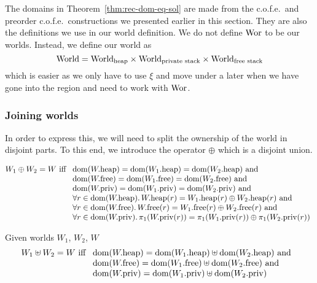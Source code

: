 \begin{jversion}
The domains in Theorem~\ref{thm:rec-dom-eq-sol} are made from the c.o.f.e.\ and preorder c.o.f.e.\ constructions we presented earlier in this section.
They are also the definitions we use in our world definition.
We do not define $\Wor$ to be our worlds.
Instead, we define our world as
\[
  \World = \Worldh \times \Worlds \times \Worldfs
\]
which is easier as we only have to use $\xi$ and move under a later when we have gone into the region and need to work with $\Wor$.

\subsubsection{Joining worlds}
In order to express this, we will need to split the ownership of the world in disjoint parts.
To this end, we introduce the operator $\oplus$ which is a disjoint union.
\begin{definition}
  \[
    W_1 \oplus W_2 = W
  \text{ iff }
  \begin{array}[t]{l}
    \dom(\pwheap) = \dom(\pwheap[W_1]) = \dom(\pwheap[W_2]) \tand \\
    \dom(\pwfree) = \dom(\pwfree[W_1]) = \dom(\pwfree[W_2]) \tand \\
    \dom(\pwpriv) = \dom(\pwpriv[W_1]) = \dom(\pwpriv[W_2]) \tand \\
    \forall r \in \dom(\pwheap) \ldotp \pwheap(r) = \pwheap[W_1](r) \oplus \pwheap[W_2](r) \tand \\
    \forall r \in \dom(\pwfree) \ldotp \pwfree(r) = \pwfree[W_1](r) \oplus \pwfree[W_2](r) \tand \\
    \forall r \in \dom(\pwpriv) \ldotp \pi_1(\pwpriv(r)) = \pi_1(\pwpriv[W_1](r)) \oplus \pi_1(\pwpriv[W_2](r))
  \end{array}
  \]
\end{definition}

\begin{definition}
  Given worlds $W_1$, $W_2$, $W$
  \[
    W_1 \uplus W_2 = W
    \text{ iff }
    \begin{array}[t]{l}
      \dom(\pwheap) = \dom(\pwheap[W_1]) \uplus \dom(\pwheap[W_2]) \tand \\
      \dom(\pwfree) = \dom(\pwfree[W_1]) \uplus \dom(\pwfree[W_2]) \tand \\
      \dom(\pwpriv) = \dom(\pwpriv[W_1]) \uplus \dom(\pwpriv[W_2]) \\
    \end{array}
  \]
\end{definition}


\end{jversion}
